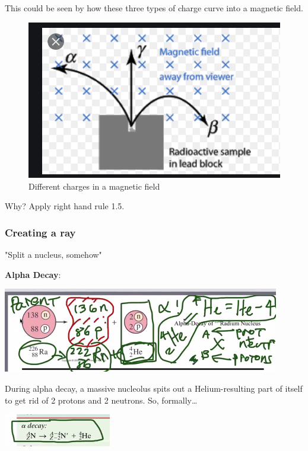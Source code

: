 \documentclass[letterpaper]{article}
\begin{document}
This could be seen by how these three types of charge curve into a
magnetic field.

\begin{figure}[htbp]
\centering
\includegraphics[width=.9\linewidth]{alphabetagamma.png}
\caption{Different charges in a magnetic field}
\end{figure}

Why? Apply right hand rule 1.5.

\subsubsection{Creating a ray}
\label{sec:org1fa3a0f}
"Split a nucleus, somehow"

\textbf{Alpha Decay}:

\begin{center}
\includegraphics[width=.9\linewidth]{alphadecay.png}
\end{center}

During alpha decay, a massive nucleolus spits out a Helium-resulting
part of itself to get rid of 2 protons and 2 neutrons. So, formally\ldots{}

\begin{center}
\includegraphics[width=.9\linewidth]{alphadecaybetter.png}
\end{center}
\end{document}
